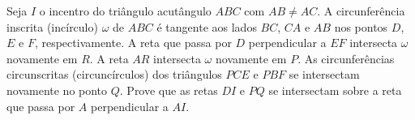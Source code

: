 Seja $I$ o incentro do triângulo acutângulo $ABC$ com $AB \neq AC$. A circunferência
inscrita (incírculo) $\omega$ de $ABC$ é tangente aos lados $BC$, $CA$ e $AB$ nos pontos $D$, $E$ e $F$, respectivamente.
A reta que passa por $D$ perpendicular a $EF$ intersecta $\omega$ novamente em $R$. A reta $AR$
intersecta $\omega$ novamente em $P$. As circunferências circunscritas (circuncírculos) dos triângulos $PCE$
e $PBF$ se intersectam novamente no ponto $Q$.
Prove que as retas $DI$ e $PQ$ se intersectam sobre a reta que passa por $A$ perpendicular a $AI$.